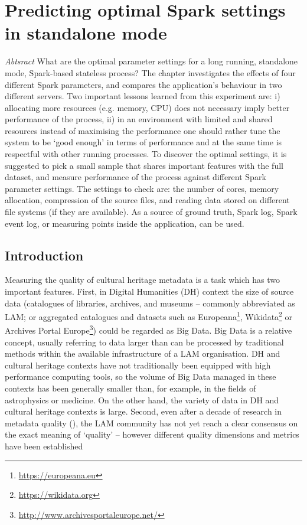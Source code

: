 \chapter{Predicting optimal Spark settings in standalone mode}

\emph{Abtsract} What are the optimal parameter settings for a long running, standalone mode, Spark-based stateless process? The chapter investigates the effects of four different Spark parameters, and compares the application's behaviour in two different servers. Two important lessons learned from this experiment are: i) allocating more resources (e.g. memory, CPU) does not necessary imply better performance of the process, ii) in an environment with limited and shared resources instead of maximising the performance one should rather tune the system to be `good enough' in terms of performance and at the same time is respectful with other running processes. To discover the optimal settings, it is suggested to pick a small sample that shares important features with the full dataset, and measure performance of the process against different Spark parameter settings. The settings to check are: the number of cores, memory allocation, compression of the source files, and reading data stored on different file systems (if they are available). As a source of ground truth, Spark log, Spark event log, or measuring points inside the application, can be used.


\section{Introduction}
Measuring the quality of cultural heritage metadata is a task which has two important features. First, in Digital Humanities (DH) context the size of source data (catalogues of libraries, archives, and museums -- commonly abbreviated as LAM; or aggregated catalogues and datasets such as Europeana\footnote{\url{https://europeana.eu}}, Wikidata\footnote{\url{https://wikidata.org}} or Archives Portal Europe\footnote{\url{http://www.archivesportaleurope.net/}}) could be regarded as Big Data. Big Data is a relative concept, usually referring to data larger than can be processed by traditional methods within the available infrastructure of a LAM organisation. DH and cultural heritage contexts have not traditionally been equipped with high performance computing tools, so the volume of Big Data managed in these contexts has been generally smaller than, for example, in the fields of astrophysics or medicine. On the other hand, the variety of data in DH and cultural heritage contexts is large. Second, even after a decade of research in metadata quality (\cite{zotero-bibliography}), the LAM community has not yet reach a clear consensus on the exact meaning of `quality' -- however different quality dimensions and metrics have been established


